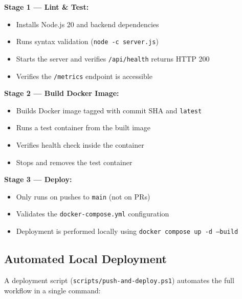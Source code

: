 \documentclass[12pt,a4paper]{article}
\begin{document}
\textbf{Stage 1 --- Lint \& Test:}
\begin{itemize}[nosep]
    \item Installs Node.js 20 and backend dependencies
    \item Runs syntax validation (\texttt{node -c server.js})
    \item Starts the server and verifies \texttt{/api/health} returns HTTP 200
    \item Verifies the \texttt{/metrics} endpoint is accessible
\end{itemize}

\textbf{Stage 2 --- Build Docker Image:}
\begin{itemize}[nosep]
    \item Builds Docker image tagged with commit SHA and \texttt{latest}
    \item Runs a test container from the built image
    \item Verifies health check inside the container
    \item Stops and removes the test container
\end{itemize}

\textbf{Stage 3 --- Deploy:}
\begin{itemize}[nosep]
    \item Only runs on pushes to \texttt{main} (not on PRs)
    \item Validates the \texttt{docker-compose.yml} configuration
    \item Deployment is performed locally using \texttt{docker compose up -d --build}
\end{itemize}

\begin{center}
\end{center}

\begin{center}
\end{center}

\subsection{Automated Local Deployment}
A deployment script (\texttt{scripts/push-and-deploy.ps1}) automates the full workflow in a single command:
\end{document}
